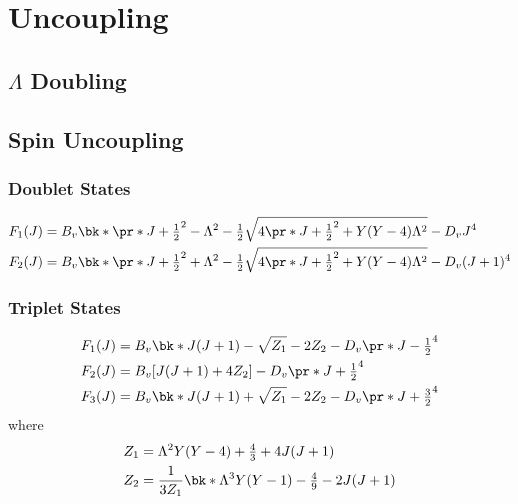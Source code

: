 \chapter{Uncoupling}
\label{c:uncoupling}

\section{\texorpdfstring{$\Lambda$}{Λ} Doubling}
\label{s:lambda_doubling}

\section{Spin Uncoupling}
\label{s:spin_uncoupling}

\subsection{Doublet States}

\begin{align*}
    F_1(J) &= B_v\bk*{\pr*{J + \tfrac{1}{2}}^2 - \Lambda^2 - \tfrac{1}{2}\sqrt{4\pr*{J + \tfrac{1}{2}}^2 + Y(Y - 4)\Lambda^2}} - D_vJ^4 \\
    F_2(J) &= B_v\bk*{\pr*{J + \tfrac{1}{2}}^2 + \Lambda^2 - \tfrac{1}{2}\sqrt{4\pr*{J + \tfrac{1}{2}}^2 + Y(Y - 4)\Lambda^2}} - D_v(J + 1)^4
\end{align*}

\subsection{Triplet States}

\begin{align*}
    F_1(J) &= B_v\bk*{J(J + 1) - \sqrt{Z_1} - 2Z_2} - D_v\pr*{J - \tfrac{1}{2}}^4 \\
    F_2(J) &= B_v[J(J + 1) + 4Z_2] - D_v\pr*{J + \tfrac{1}{2}}^4 \\
    F_3(J) &= B_v\bk*{J(J + 1) + \sqrt{Z_1} - 2Z_2} - D_v\pr*{J + \tfrac{3}{2}}^4
\end{align*}
where
\begin{align*}
    Z_1 &= \Lambda^2Y(Y - 4) + \tfrac{4}{3} + 4J(J + 1) \\
    Z_2 &= \frac{1}{3Z_1}\bk*{\Lambda^3Y(Y - 1) - \tfrac{4}{9} - 2J(J + 1)}
\end{align*}
